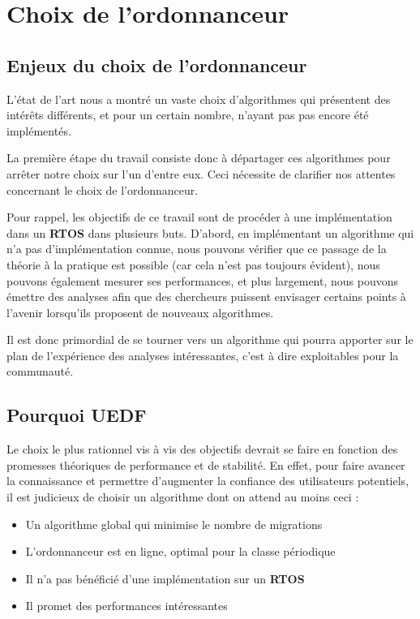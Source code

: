 \section{Choix de l'ordonnanceur}

	\subsection{Enjeux du choix de l'ordonnanceur}

	L'état de l'art nous a montré un vaste choix d'algorithmes qui présentent 
	des intérêts différents, et pour un certain nombre, 
	n'ayant pas pas encore été implémentés. \newline
	
	La première étape du travail consiste donc à départager ces algorithmes pour arrêter notre choix sur l'un d'entre eux. Ceci nécessite de clarifier nos attentes concernant le choix de l'ordonnanceur.\newline
	
	Pour rappel, les objectifs de ce travail sont de procéder à une implémentation dans 
	un \textbf{RTOS} dans plusieurs buts. 
	D'abord, en implémentant un algorithme qui n'a pas d'implémentation connue, nous 
	pouvons vérifier que ce passage de la théorie à la pratique est possible (car cela n'est pas 
	toujours évident), nous pouvons également mesurer ses performances, et plus largement, nous 
	pouvons émettre des analyses afin que des chercheurs puissent envisager certains points à l'avenir 
	lorsqu'ils proposent de nouveaux algorithmes. \newline
	 
	Il est donc primordial de se tourner vers un algorithme qui pourra apporter sur le plan de 
	l'expérience des analyses intéressantes, c'est à dire exploitables pour la communauté.\newline
	
	

	\subsection{Pourquoi UEDF}
	
	Le choix le plus rationnel vis à vis des objectifs devrait se faire en fonction des 
	promesses théoriques de performance et de stabilité. 
	En effet, pour faire avancer la connaissance et permettre d'augmenter la confiance des utilisateurs 
	potentiels, il est judicieux de choisir un algorithme dont on attend au moins ceci :
	\begin{itemize}
		\item Un algorithme global qui minimise le nombre de migrations
		\item L'ordonnanceur est en ligne, optimal pour la classe périodique
		\item Il n'a pas bénéficié d'une implémentation sur un \textbf{RTOS}
		\item Il promet des performances intéressantes
	\end{itemize}
	
